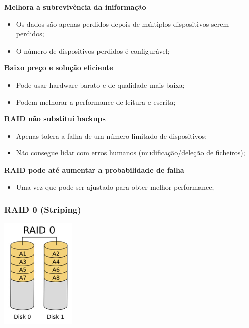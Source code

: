 \documentclass{article}
\begin{document}
\begin{flushleft}
  \textbf{Melhora a subrevivência da iniformação}
  \begin{itemize}
    \item Os dados são apenas perdidos depois de múltiplos dispositivos serem perdidos;
    \item O número de dispositivos perdidos é configurável;
  \end{itemize}

  \textbf{Baixo preço e solução eficiente}
  \begin{itemize}
    \item Pode usar hardware barato e de qualidade mais baixa;
    \item Podem melhorar a performance de leitura e escrita;
  \end{itemize}

  \textbf{RAID não substitui backups}
  \begin{itemize}
    \item Apenas tolera a falha de um número limitado de dispositivos;
    \item Não consegue lidar com erros humanos (mudificação/deleção de ficheiros);
  \end{itemize}

  \textbf{RAID pode até aumentar a probabilidade de falha}
  \begin{itemize}
    \item Uma vez que pode ser ajustado para obter melhor performance;
  \end{itemize}
\end{flushleft}

\subsubsection{RAID 0 (Striping)}

\begin{center}
  \includegraphics[scale=0.6]{32}
\end{center}
\end{document}
